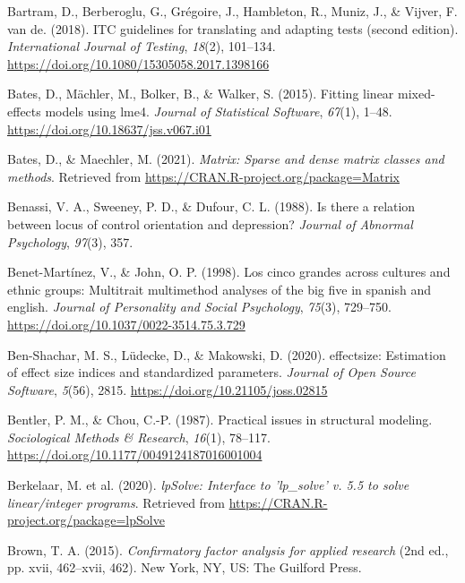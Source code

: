 \documentclass[
  man]{apa6}
\newlength{\cslhangindent}
\newlength{\cslentryspacingunit} %
\newenvironment{CSLReferences}[2] %
 {%
  \setlength{\parindent}{0pt}
  \ifodd #1
  \let\oldpar\par
  \def\par{\hangindent=\cslhangindent\oldpar}
  \fi
  \setlength{\parskip}{#2\cslentryspacingunit}
 }%
 {}
\begin{document}
\begin{CSLReferences}{1}{0}
\leavevmode{}%
Bartram, D., Berberoglu, G., Grégoire, J., Hambleton, R., Muniz, J., \& Vijver, F. van de. (2018). ITC guidelines for translating and adapting tests (second edition). \emph{International Journal of Testing}, \emph{18}(2), 101--134. \url{https://doi.org/10.1080/15305058.2017.1398166}

\leavevmode{}%
Bates, D., Mächler, M., Bolker, B., \& Walker, S. (2015). Fitting linear mixed-effects models using {lme4}. \emph{Journal of Statistical Software}, \emph{67}(1), 1--48. \url{https://doi.org/10.18637/jss.v067.i01}

\leavevmode{}%
Bates, D., \& Maechler, M. (2021). \emph{Matrix: Sparse and dense matrix classes and methods}. Retrieved from \url{https://CRAN.R-project.org/package=Matrix}

\leavevmode{}%
Benassi, V. A., Sweeney, P. D., \& Dufour, C. L. (1988). Is there a relation between locus of control orientation and depression? \emph{Journal of Abnormal Psychology}, \emph{97}(3), 357.

\leavevmode{}%
Benet-Martínez, V., \& John, O. P. (1998). Los cinco grandes across cultures and ethnic groups: Multitrait multimethod analyses of the big five in spanish and english. \emph{Journal of Personality and Social Psychology}, \emph{75}(3), 729--750. \url{https://doi.org/10.1037/0022-3514.75.3.729}

\leavevmode{}%
Ben-Shachar, M. S., Lüdecke, D., \& Makowski, D. (2020). {e}ffectsize: Estimation of effect size indices and standardized parameters. \emph{Journal of Open Source Software}, \emph{5}(56), 2815. \url{https://doi.org/10.21105/joss.02815}

\leavevmode{}%
Bentler, P. M., \& Chou, C.-P. (1987). Practical issues in structural modeling. \emph{Sociological Methods \& Research}, \emph{16}(1), 78--117. \url{https://doi.org/10.1177/0049124187016001004}

\leavevmode{}%
Berkelaar, M. et al. (2020). \emph{lpSolve: Interface to 'lp\_solve' v. 5.5 to solve linear/integer programs}. Retrieved from \url{https://CRAN.R-project.org/package=lpSolve}

\leavevmode{}%
Brown, T. A. (2015). \emph{Confirmatory factor analysis for applied research} (2nd ed., pp. xvii, 462--xvii, 462). New York, NY, US: The Guilford Press.


\end{CSLReferences}
\end{document}

